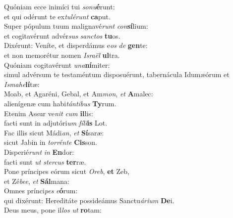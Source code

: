\evenverse Quóniam ecce inimíci tui \textit{so}\textit{nu}\textbf{é}runt:~\*\\
\evenverse et qui odérunt te ex\textit{tu}\textit{lé}\textit{runt} \textbf{ca}put.\\
\oddverse Super pópulum tuum malignavé\textit{runt} \textit{con}\textbf{sí}lium:~\*\\
\oddverse et cogitavérunt advér\textit{sus} \textit{san}\textit{ctos} \textbf{tu}os.\\
\evenverse Dixérunt: Veníte, et disperdámus e\textit{os} \textit{de} \textbf{gen}te:~\*\\
\evenverse et non memorétur nomen \textit{Is}\textit{ra}\textit{ël} \textbf{ul}tra.\\
\oddverse Quóniam cogitavérunt \textit{u}\textit{na}\textbf{ní}miter:~\*\\
\oddverse simul advérsum te testaméntum disposuérunt, tabernácula Idumæórum et \textit{Is}\textit{ma}\textit{he}\textbf{lí}tæ:\\
\evenverse Moab, et Agaréni, Gebal, et Am\textit{mon}, \textit{et} \textbf{A}malec:~\*\\
\evenverse alienígenæ cum habi\textit{tán}\textit{ti}\textit{bus} \textbf{Ty}rum.\\
\oddverse Etenim Assur ve\textit{nit} \textit{cum} \textbf{il}lis:~\*\\
\oddverse facti sunt in adjutóri\textit{um} \textit{fí}\textit{li}\textbf{is} Lot.\\
\evenverse Fac illis sicut Mádi\textit{an}, \textit{et} \textbf{Sí}saræ:~\*\\
\evenverse sicut Jabin in \textit{tor}\textit{rén}\textit{te} \textbf{Cis}son.\\
\oddverse Disperié\textit{runt} \textit{in} \textbf{En}dor:~\*\\
\oddverse facti sunt \textit{ut} \textit{ster}\textit{cus} \textbf{ter}ræ.\\
\evenverse Pone príncipes eórum sicut \textit{O}\textit{reb}, \textbf{et} Zeb,~\*\\
\evenverse et Zé\textit{be}\textit{e}, \textit{et} \textbf{Sál}mana:\\
\oddverse Omnes prínci\textit{pes} \textit{e}\textbf{ó}rum:~\*\\
\oddverse qui dixérunt: Hereditáte possideámus Sanctu\textit{á}\textit{ri}\textit{um} \textbf{De}i.\\
\evenverse Deus meus, pone il\textit{los} \textit{ut} \textbf{ro}tam:~\*\\
